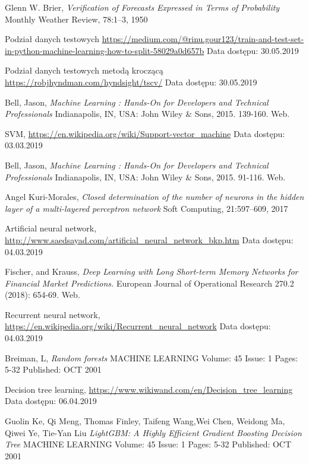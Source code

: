 \documentclass[a4paper, twoside, 11pt, openright]{article}
\begin{document}
\begin{thebibliography}{9}
	Glenn W. Brier, 
  \textit{Verification of Forecasts Expressed in Terms of Probability}
  Monthly Weather Review, 78:1–3, 1950

 Podział danych testowych \url{https://medium.com/@rinu.gour123/train-and-test-set-in-python-machine-learning-how-to-split-58029a0d657b}
 Data dostępu: 30.05.2019
 
 
 Podział danych testowych metodą kroczącą \url{https://robjhyndman.com/hyndsight/tscv/}
 Data dostępu: 30.05.2019
 
	Bell, Jason, \textit{Machine Learning : Hands-On for Developers and Technical Professionals}  Indianapolis, IN, USA: John Wiley \& Sons, 2015. 139-160. Web.
	
	SVM, \url{https://en.wikipedia.org/wiki/Support-vector_machine} 
	Data dostępu: 03.03.2019

	Bell, Jason, \textit{Machine Learning : Hands-On for Developers and Technical Professionals}  Indianapolis, IN, USA: John Wiley \& Sons, 2015. 91-116. Web.


	Angel Kuri-Morales, 
  \textit{Closed determination of the number of neurons in the hidden layer of a multi-layered perceptron network}
  Soft Computing, 21:597–609, 2017

	Artificial neural network, \url{http://www.saedsayad.com/artificial_neural_network_bkp.htm} 
	Data dostępu: 04.03.2019

	Fischer, and Krauss, 
  \textit{Deep Learning with Long Short-term Memory Networks for Financial Market Predictions.}
  European Journal of Operational Research 270.2 (2018): 654-69. Web.

	Recurrent neural network, \url{https://en.wikipedia.org/wiki/Recurrent_neural_network} 
	Data dostępu: 04.03.2019

	Breiman, L, 
  \textit{Random forests}
	MACHINE LEARNING  Volume: 45   Issue: 1   Pages: 5-32   Published: OCT 2001


	Decision tree learning, \url{https://www.wikiwand.com/en/Decision_tree_learning} 
	Data dostępu: 06.04.2019


Guolin Ke, Qi Meng, Thomas Finley, Taifeng Wang,Wei Chen, Weidong Ma, Qiwei Ye, Tie-Yan Liu
  \textit{LightGBM: A Highly Efficient Gradient Boosting Decision Tree}
	MACHINE LEARNING  Volume: 45   Issue: 1   Pages: 5-32   Published: OCT 2001


\end{thebibliography}
\end{document}
